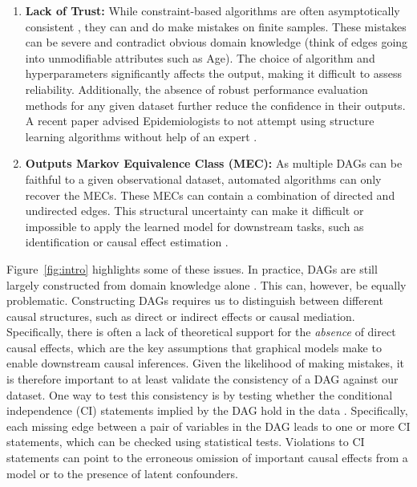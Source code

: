 \documentclass[accepted]{uai2025} %
\begin{document}
\begin{enumerate}
	\item \textbf{Lack of Trust:} While constraint-based algorithms are 
		often asymptotically
		consistent \citep{KalischB07}, they can and do make mistakes
		on  finite samples. These mistakes can be severe and contradict
		obvious domain knowledge (think of edges going into unmodifiable
		attributes such as Age). The choice of algorithm and hyperparameters
		significantly affects the output, making it
		difficult to assess reliability. Additionally, the absence of
		robust performance evaluation methods for any given dataset
		further reduce the confidence in their outputs. A recent paper
		 advised Epidemiologists to not attempt using structure
		learning algorithms without help of an expert \citep{Gururaghavendran_2024}.
	\item \textbf{Outputs Markov Equivalence Class (MEC):} As multiple
		DAGs can be faithful to a given observational dataset, automated 
		algorithms can only recover the MECs. These MECs can contain a
		combination of directed and undirected edges. This structural uncertainty
		can make it difficult or impossible to apply the learned model for downstream
		tasks, such as identification or causal
		effect estimation \citep{Maathuis_2009,PerkovicTKM17}.
\end{enumerate}

Figure~\ref{fig:intro} highlights some of these issues. In practice, DAGs 
are still largely constructed from domain knowledge alone 
\citep{Tennant2020,Petersen2021}. This can, however, be equally problematic.
Constructing DAGs requires us to distinguish between different causal structures, 
such as direct or indirect effects or causal mediation. Specifically, there is often a lack
of theoretical support for the \emph{absence} of direct causal effects, which are 
the key assumptions that graphical models make to enable downstream causal inferences.
Given the likelihood of making mistakes, it is therefore
important to at least validate the consistency of a DAG against our dataset. One way to
test this consistency is by testing whether the conditional independence 
(CI) statements implied by the DAG hold in the data \citep{Ankan2021}. Specifically, 
each missing edge between
a pair of variables in the DAG leads to one or more CI statements, 
which can be checked using statistical tests. Violations to CI
statements can point to the erroneous omission of important causal effects from a model
or to the presence of latent confounders.
\end{document}
